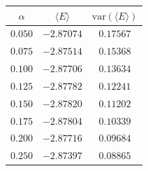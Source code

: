 \begin{tabular}{ccc}
\toprule
$\alpha$ & $\langle E \rangle$ & $\mathrm{var}(\langle E \rangle)$ \\
\midrule
$0.050$ & $-2.87074$ & $0.17567$ \\
$0.075$ & $-2.87514$ & $0.15368$ \\
$0.100$ & $-2.87706$ & $0.13634$ \\
$0.125$ & $-2.87782$ & $0.12241$ \\
$0.150$ & $-2.87820$ & $0.11202$ \\
$0.175$ & $-2.87804$ & $0.10339$ \\
$0.200$ & $-2.87716$ & $0.09684$ \\
$0.250$ & $-2.87397$ & $0.08865$ \\
\bottomrule
\end{tabular}
